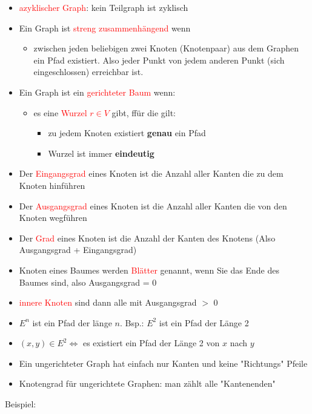 \documentclass[12pt]{article}
\begin{document}
\begin{flushleft}
\begin{itemize}
        \item \textcolor{red}{azyklischer Graph}: kein Teilgraph ist zyklisch
        \item Ein Graph ist \textcolor{red}{streng zusammenhängend} wenn
        \begin{itemize}
            \item zwischen jeden beliebigen zwei Knoten (Knotenpaar) aus dem Graphen ein Pfad existiert. Also jeder Punkt von jedem anderen Punkt (sich eingeschlossen) erreichbar ist. 
        \end{itemize}
        \item Ein Graph ist ein \textcolor{red}{gerichteter Baum} wenn:
        \begin{itemize}
            \item es eine \textcolor{red}{Wurzel $r \in V$} gibt, ffür die gilt:
            \begin{itemize}
                \item zu jedem Knoten existiert \textbf{genau} ein Pfad
                \item Wurzel ist immer \textbf{eindeutig}
            \end{itemize}
        \end{itemize}
        \item Der \textcolor{red}{Eingangsgrad} eines Knoten ist die Anzahl aller Kanten die zu dem Knoten hinführen
        \item Der \textcolor{red}{Ausgangsgrad} eines Knoten ist die Anzahl aller Kanten die von den Knoten wegführen
        \item Der \textcolor{red}{Grad} eines Knoten ist die Anzahl der Kanten des Knotens (Also Ausgangsgrad + Eingangsgrad)
        \item Knoten eines Baumes werden \textcolor{red}{Blätter} genannt, wenn Sie das Ende des Baumes sind, also Ausgangsgrad = 0
        \item \textcolor{red}{innere Knoten} sind dann alle mit Ausgangsgrad $>$ 0
        \item $E^n$ ist ein Pfad der länge $n$. Bsp.: $E^2$ ist ein Pfad der Länge 2
        \item $(x,y) \in E^2 \Leftrightarrow$ es existiert ein Pfad der Länge 2 von $x$ nach $y$
        \item Ein ungerichteter Graph hat einfach nur Kanten und keine "Richtungs" Pfeile
        \item Knotengrad für ungerichtete Graphen: man zählt alle "Kantenenden"
    \end{itemize}
    \vspace{1cm}
    Beispiel: \linebreak
    \linebreak
\end{flushleft}
\end{document}
